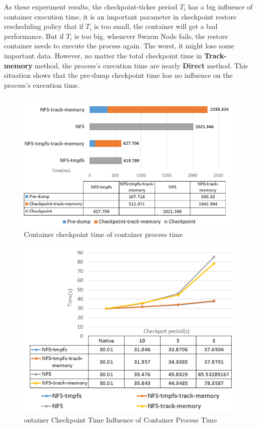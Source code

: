 As these experiment results, the checkpoint-ticker period $ T_i $ has a big influence of container execution time, it is an important parameter in checkpoint restore rescheduling policy that if $ T_i $ is too small, the container will get a bad performance. But if $ T_i $ is too big, whenever Swarm Node fails, the restore container needs to execute the process again. The worst, it might lose some important data. However, no matter the total checkpoint time in \textbf{Track-memory} method, the process's execution time are nearly 
\textbf{Direct} method. This situation shows that the pre-dump checkpoint time has no influence on the process's execution time.

\begin{figure}[hbtp]
\begin{center}
\includegraphics[width=14cm]{figure/cpu_checkpoint_time.png}
\end{center}
\caption{Container checkpoint time of container process time}
\label{fig:Checkpoint Time CPU}
\end{figure}

\begin{figure}[hbtp]
\begin{center}
\includegraphics[width=14cm]{figure/cpu_checkpoint_period.png}
\end{center}
\caption{ontainer Checkpoint Time Influence of Container Process Time}
\label{fig:Checkpoint Time Influence CPU}
\end{figure}

